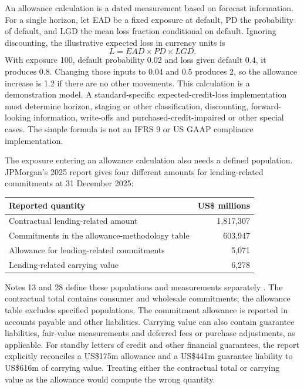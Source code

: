 \newpage
An allowance calculation is a dated measurement based on forecast information.
For a single horizon, let EAD be a fixed exposure at default, PD the probability
of default, and LGD the mean loss fraction conditional on default. Ignoring
discounting, the illustrative expected loss in currency units is
\[
 L=EAD\times PD\times LGD.
\]
With exposure 100, default probability 0.02 and loss given default 0.4, it
produces 0.8. Changing those inputs to 0.04 and 0.5 produces 2, so the allowance
increase is 1.2 if there are no other movements. This calculation is a
demonstration model. A standard-specific expected-credit-loss implementation
must determine horizon, staging or other classification, discounting,
forward-looking information, write-offs and purchased-credit-impaired or
other special cases. The simple formula is not an IFRS 9 or US GAAP compliance
implementation.

The exposure entering an allowance calculation also needs a defined
population. JPMorgan's 2025 report gives four different amounts for
lending-related commitments at 31 December 2025:
\begin{center}
\begin{tabularx}{\linewidth}{@{}Xr@{}}
\toprule
Reported quantity & US\$ millions \\
\midrule
Contractual lending-related amount & 1,817,307 \\
Commitments in the allowance-methodology table & 603,947 \\
Allowance for lending-related commitments & 5,071 \\
Lending-related carrying value & 6,278 \\
\bottomrule
\end{tabularx}
\end{center}
Notes 13 and 28 define these populations and measurements separately
\citep[pp.~258--262, 295--297]{jpmorgan2025tenk}. The contractual total
contains consumer and wholesale commitments; the allowance table excludes
specified populations. The commitment allowance is reported in accounts
payable and other liabilities. Carrying value can also contain guarantee
liabilities, fair-value measurements and deferred fees or purchase adjustments,
as applicable. For standby letters of credit and other financial guarantees,
the report explicitly reconciles a US\$175m allowance and a US\$441m guarantee
liability to US\$616m of carrying value. Treating either the contractual total
or carrying value as the allowance would compute the wrong quantity.

